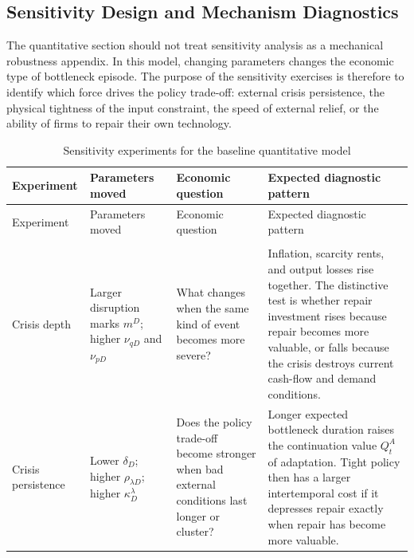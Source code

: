 ﻿\documentclass[12pt]{article}
\theoremstyle{remark}
\begin{document}
\subsection{Sensitivity Design and Mechanism Diagnostics}
\label{app:sensitivity_design}

The quantitative section should not treat sensitivity analysis as a mechanical robustness appendix.
In this model, changing parameters changes the economic type of bottleneck episode. The purpose of
the sensitivity exercises is therefore to identify which force drives the policy trade-off:
external crisis persistence, the physical tightness of the input constraint, the speed of external
relief, or the ability of firms to repair their own technology.

\begingroup
\small
\setlength{\tabcolsep}{3pt}
\begin{longtable}{
>{\raggedright\arraybackslash}p{}
>{\raggedright\arraybackslash}p{}
>{\raggedright\arraybackslash}p{}
>{\raggedright\arraybackslash}p{}}
\caption{Sensitivity experiments for the baseline quantitative model}
\label{tab:sensitivity_design}\\
\toprule
Experiment & Parameters moved & Economic question & Expected diagnostic pattern \\
\midrule
\endfirsthead
\toprule
Experiment & Parameters moved & Economic question & Expected diagnostic pattern \\
\midrule
\endhead
\midrule
\multicolumn{4}{r}{Continued on next page} \\
\midrule
\endfoot
\bottomrule
\endlastfoot

Crisis depth
&
Larger disruption marks $m^D$; higher $\nu_{qD}$ and $\nu_{pD}$
&
What changes when the same kind of event becomes more severe?
&
Inflation, scarcity rents, and output losses rise together. The distinctive test is whether repair
investment rises because repair becomes more valuable, or falls because the crisis destroys current
cash-flow and demand conditions.
\\

Crisis persistence
&
Lower $\delta_D$; higher $\rho_{\lambda D}$; higher $\kappa_D^\lambda$
&
Does the policy trade-off become stronger when bad external conditions last longer or cluster?
&
Longer expected bottleneck duration raises the continuation value $Q_t^A$ of adaptation. Tight
policy then has a larger intertemporal cost if it depresses repair exactly when repair has become
more valuable.
\\


\end{longtable}
\end{document}
